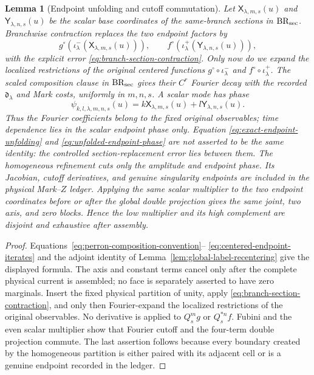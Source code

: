 \documentclass[11pt]{article}
\newtheorem{lemma}[theorem]{Lemma}
\begin{document}
\begin{lemma}[Endpoint unfolding and cutoff commutation]
Let $\mathsf X_{\lambda,m,s}(u)$ and
$\mathsf Y_{\lambda,n,s}(u)$ be the scalar base coordinates of the
same-branch sections in $\mathrm{BR}_{\rm sec}$.  Branchwise contraction
replaces the two endpoint factors by
\begin{equation}
\label{eq:endpoint-to-section-stage}
 g^\circ\!\left(\iota^-_\lambda(\mathsf X_{\lambda,m,s}(u))\right),
 \qquad
 f^\circ\!\left(\iota^+_\lambda(\mathsf Y_{\lambda,n,s}(u))\right),
\end{equation}
with the explicit error \eqref{eq:branch-section-contraction}.  Only now do
we expand the localized restrictions of the \emph{original centered}
functions $g^\circ\circ\iota^-_\lambda$ and
$f^\circ\circ\iota^+_\lambda$.  The scaled composition clause in
$\mathrm{BR}_{\rm sec}$ gives their $C^r$ Fourier decay with the recorded
$\mathfrak d_\lambda$ and Mark costs, uniformly in $m,n,s$.  A scalar mode
has phase
\begin{equation}
\label{eq:unfolded-endpoint-phase}
 \psi_{k,l,\lambda,m,n,s}(u)
 =k\mathsf X_{\lambda,m,s}(u)
  +l\mathsf Y_{\lambda,n,s}(u).
\end{equation}
Thus the Fourier coefficients belong to the fixed original observables;
time dependence lies in the scalar endpoint phase only.  Equation
\eqref{eq:exact-endpoint-unfolding} and
\eqref{eq:unfolded-endpoint-phase} are not asserted to be the same identity:
the controlled section-replacement error lies between them.
The homogeneous refinement cuts only the amplitude and endpoint phase.  Its
Jacobian, cutoff derivatives, and genuine singularity endpoints are included
in the physical Mark--$Z$ ledger.  Applying the same scalar multiplier to the
two endpoint coordinates before or after the global double projection gives
the same joint, two axis, and zero blocks.  Hence the low multiplier and its
high complement are disjoint and exhaustive after assembly.
\end{lemma}

\begin{proof}
Equations~\eqref{eq:perron-composition-convention}--
\eqref{eq:centered-endpoint-iterates} and the adjoint identity of
Lemma~\ref{lem:global-label-recentering} give the displayed formula.  The
axis and constant terms cancel only after the complete physical current is
assembled; no face is separately asserted to have zero marginals.  Insert
the fixed physical partition of unity, apply
\eqref{eq:branch-section-contraction}, and only then Fourier-expand the
localized restrictions of the original observables.  No derivative is applied to $Q_s^mg$ or
$Q_s^{*n}f$.  Fubini and the even scalar multiplier show that Fourier cutoff
and the four-term double projection commute.  The last assertion follows
because every boundary created by the homogeneous partition is either paired
with its adjacent cell or is a genuine endpoint recorded in the ledger.
\end{proof}
\end{document}
